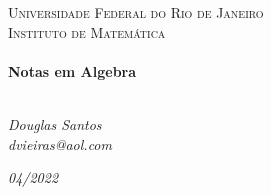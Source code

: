 \begin{titlepage}
   \begin{center}
      \textsc{\Large Universidade Federal do Rio de Janeiro}\\
      \textsc{\large Instituto de Matemática}\\[1.5cm]
      \LinhaR \\[0.4cm]
         { \LARGE \bfseries Notas em Algebra \\[0.4cm]}
      \LinhaR \\[1.4cm]
      \noindent

      \begin{minipage}{0.4\textwidth}
         \begin{center} \large
            \emph{Douglas Santos}\\
            \itshape{dvieiras@aol.com}
         \end{center}
      \end{minipage}

      \begin{center}
      \end{center}
      \vfill
      {\large \textit{04/2022}}
   \end{center}
\end{titlepage}
\clearpage